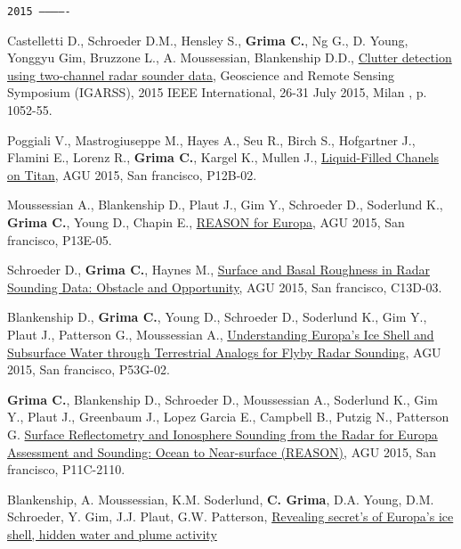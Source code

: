 \begin{etaremune}
\hspace{-2em}\texttt{2015 -------------}

\item
  Castelletti D., Schroeder D.M., Hensley S., \textbf{Grima C.}, Ng G.,
  D. Young, Yonggyu Gim, Bruzzone L., A. Moussessian, Blankenship D.D.,
  \href{http://ieeexplore.ieee.org/xpl/articleDetails.jsp?reload=true\&arnumber=7325950}{Clutter
  detection using two-channel radar sounder data}, Geoscience and Remote
  Sensing Symposium (IGARSS), 2015 IEEE International, 26-31 July 2015,
  Milan , p. 1052-55.
\item
  Poggiali V., Mastrogiuseppe M., Hayes A., Seu R., Birch S., Hofgartner
  J., Flamini E., Lorenz R., \textbf{Grima C.}, Kargel K., Mullen J.,
  \href{https://agu.confex.com/agu/fm15/meetingapp.cgi/Paper/83937}{Liquid-Filled
  Chanels on Titan}, AGU 2015, San francisco, P12B-02.
\item
  Moussessian A., Blankenship D., Plaut J., Gim Y., Schroeder D.,
  Soderlund K., \textbf{Grima C.}, Young D., Chapin E.,
  \href{https://agu.confex.com/agu/fm15/meetingapp.cgi/Paper/84483}{REASON
  for Europa}, AGU 2015, San francisco, P13E-05.
\item
  Schroeder D., \textbf{Grima C.}, Haynes M.,
  \href{https://agu.confex.com/agu/fm15/meetingapp.cgi/Paper/61923}{Surface
  and Basal Roughness in Radar Sounding Data: Obstacle and Opportunity},
  AGU 2015, San francisco, C13D-03.
\item
  Blankenship D., \textbf{Grima C.}, Young D., Schroeder D., Soderlund
  K., Gim Y., Plaut J., Patterson G., Moussessian A.,
  \href{https://agu.confex.com/agu/fm15/meetingapp.cgi/Paper/85704}{Understanding
  Europa's Ice Shell and Subsurface Water through Terrestrial Analogs
  for Flyby Radar Sounding}, AGU 2015, San francisco, P53G-02.
\item
  \textbf{Grima C.}, Blankenship D., Schroeder D., Moussessian A.,
  Soderlund K., Gim Y., Plaut J., Greenbaum J., Lopez Garcia E.,
  Campbell B., Putzig N., Patterson G.
  \href{https://agu.confex.com/agu/fm15/meetingapp.cgi/Paper/83156}{Surface
  Reflectometry and Ionosphere Sounding from the Radar for Europa
  Assessment and Sounding: Ocean to Near-surface (REASON)}, AGU 2015,
  San francisco, P11C-2110.
\item
  Blankenship, A. Moussessian, K.M. Soderlund, \textbf{C. Grima}, D.A.
  Young, D.M. Schroeder, Y. Gim, J.J. Plaut, G.W. Patterson,
  \href{http://www.hou.usra.edu/meetings/abscicon2015/pdf/7627.pdf}{Revealing
  secret's of Europa's ice shell, hidden water and plume activity
}
\end{etaremune}
